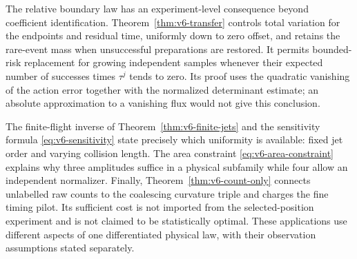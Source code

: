 The relative boundary law has an experiment-level consequence beyond
coefficient identification. Theorem~\ref{thm:v6-transfer} controls total
variation for the endpoints and residual time, uniformly down to zero
offset, and retains the rare-event mass when unsuccessful preparations
are restored. It permits bounded-risk replacement for growing independent
samples whenever their expected number of successes times $\tau^j$
tends to zero. Its proof uses the quadratic vanishing of the action
error together with the normalized determinant estimate; an absolute
approximation to a vanishing flux would not give this conclusion.

The finite-flight inverse of Theorem~\ref{thm:v6-finite-jets} and the
sensitivity formula \eqref{eq:v6-sensitivity} state precisely which
uniformity is available: fixed jet order and varying collision length.
The area constraint \eqref{eq:v6-area-constraint} explains why three
amplitudes suffice in a physical subfamily while four allow an
independent normalizer. Finally, Theorem~\ref{thm:v6-count-only} connects
unlabelled raw counts to the coalescing curvature triple and charges the
fine timing pilot. Its sufficient cost is not imported from the
selected-position experiment and is not claimed to be statistically
optimal. These applications use different aspects of one differentiated
physical law, with their observation assumptions stated separately.

